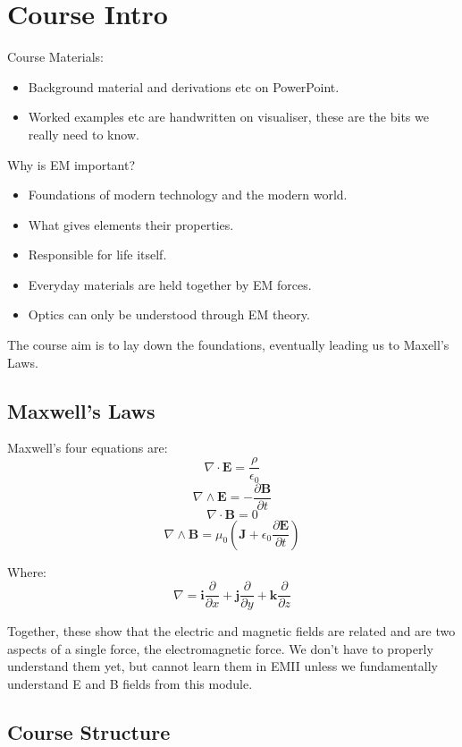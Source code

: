 
\section{Course Intro}
Course Materials:
\begin{itemize}
    \item Background material and derivations etc on PowerPoint.
    \item Worked examples etc are handwritten on visualiser, these are the bits we really need to know.
\end{itemize}

Why is EM important?
\begin{itemize}
    \item Foundations of modern technology and the modern world.
    \item What gives elements their properties.
    \item Responsible for life itself.
    \item Everyday materials are held together by EM forces.
    \item Optics can only be understood through EM theory.
\end{itemize}

The course aim is to lay down the foundations, eventually leading us to Maxell's Laws.

\subsection{Maxwell's Laws}
Maxwell's four equations are:
\[
    \nabla \cdot \pmb{E} = \frac{\rho}{\epsilon_0}
\]
\[
    \nabla \wedge \pmb{E} = -\frac{\partial \pmb{B}}{\partial t}
\]
\[
    \nabla \cdot \pmb{B} = 0
\]
\[
    \nabla \wedge \pmb{B} = \mu_0 \left(\pmb{J} + \epsilon_0 \frac{\partial \pmb{E}}{\partial t}\right)
\]

Where:
\[
    \nabla = \pmb{i} \frac{\partial}{\partial x} + \pmb{j} \frac{\partial}{\partial y} + \pmb{k} \frac{\partial}{\partial z}
\]

Together, these show that the electric and magnetic fields are related and are two aspects of a single force, the electromagnetic force. We don't have to properly understand them yet, but cannot learn them in EMII unless we fundamentally understand E and B fields from this module.

\subsection{Course Structure}

